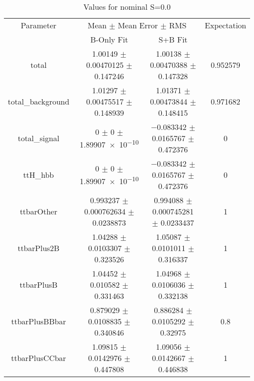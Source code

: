 \begin{table}
\centering
\caption{Values for nominal S=0.0}
\begin{tabular}{cccc}
\toprule
Parameter & \multicolumn{2}{c}{Mean $\pm$ Mean Error $\pm$ RMS} & Expectation\\
 & B-Only Fit & S+B Fit & \\
\midrule
total & \num{1.00149} $\pm$ \num{0.00470125} $\pm$ \num{0.147246} & \num{1.00138} $\pm$ \num{0.00470388} $\pm$ \num{0.147328} & \num{0.952579}\\
total\_background & \num{1.01297} $\pm$ \num{0.00475517} $\pm$ \num{0.148939} & \num{1.01371} $\pm$ \num{0.00473844} $\pm$ \num{0.148415} & \num{0.971682}\\
total\_signal & \num{0} $\pm$ \num{0} $\pm$ \num{1.89907e-10} & \num{-0.083342} $\pm$ \num{0.0165767} $\pm$ \num{0.472376} & \num{0}\\
ttH\_hbb & \num{0} $\pm$ \num{0} $\pm$ \num{1.89907e-10} & \num{-0.083342} $\pm$ \num{0.0165767} $\pm$ \num{0.472376} & \num{0}\\
ttbarOther & \num{0.993237} $\pm$ \num{0.000762634} $\pm$ \num{0.0238873} & \num{0.994088} $\pm$ \num{0.000745281} $\pm$ \num{0.0233437} & \num{1}\\
ttbarPlus2B & \num{1.04288} $\pm$ \num{0.0103307} $\pm$ \num{0.323526} & \num{1.05087} $\pm$ \num{0.0101011} $\pm$ \num{0.316337} & \num{1}\\
ttbarPlusB & \num{1.04452} $\pm$ \num{0.010582} $\pm$ \num{0.331463} & \num{1.04968} $\pm$ \num{0.0106036} $\pm$ \num{0.332138} & \num{1}\\
ttbarPlusBBbar & \num{0.879029} $\pm$ \num{0.0108835} $\pm$ \num{0.340846} & \num{0.886284} $\pm$ \num{0.0105292} $\pm$ \num{0.32975} & \num{0.8}\\
ttbarPlusCCbar & \num{1.09815} $\pm$ \num{0.0142976} $\pm$ \num{0.447808} & \num{1.09056} $\pm$ \num{0.0142667} $\pm$ \num{0.446838} & \num{1}\\
\bottomrule
\end{tabular}
\end{table}